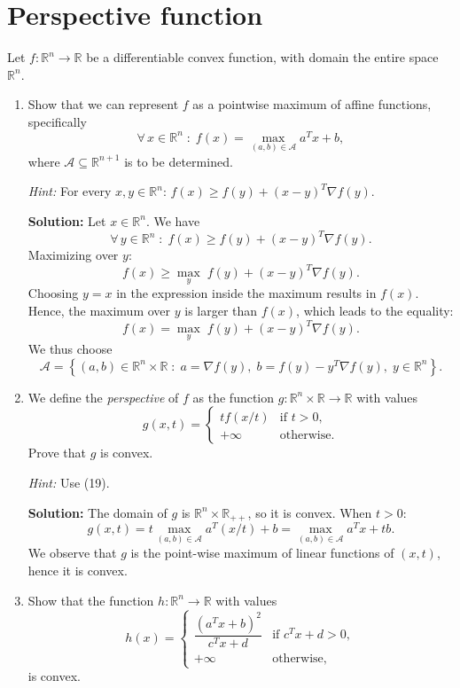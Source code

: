 \documentclass[10pt]{article}
\theoremstyle{definition}
\theoremstyle{plain}
\newcommand{\RR}{\mathbb{R}}
\begin{document}
\section{Perspective function}

Let $f : \RR^n \to \RR$ be a differentiable convex function, with domain the entire space $\RR^n$.

\begin{enumerate}[label=(\alph*)]
    \item Show that we can represent $f$ as a pointwise maximum of affine functions, specifically
    \begin{equation}
        \forall\, x \in \RR^n \;:\; f(x) = \max_{(a,b) \in \mathcal{A}} a^T x + b,
    \end{equation}
    where $\mathcal{A} \subseteq \RR^{n+1}$ is to be determined.

    \emph{Hint:} For every $x, y \in \RR^n$: $f(x) \ge f(y) + (x - y)^T \nabla f(y)$.

    \textbf{Solution:} Let $x \in \RR^n$. We have
    \[
        \forall\, y \in \RR^n \;:\; f(x) \ge f(y) + (x - y)^T \nabla f(y).
    \]
    Maximizing over $y$:
    \[
        f(x) \ge \max_y \; f(y) + (x - y)^T \nabla f(y).
    \]
    Choosing $y = x$ in the expression inside the maximum results in $f(x)$. Hence, the maximum over $y$ is larger than $f(x)$, which leads to the equality:
    \[
        f(x) = \max_y \; f(y) + (x - y)^T \nabla f(y).
    \]
    We thus choose
    \[
        \mathcal{A} = \left\{(a, b) \in \RR^n \times \RR \;:\; a = \nabla f(y), \; b = f(y) - y^T \nabla f(y), \; y \in \RR^n\right\}.
    \]

    \item We define the \emph{perspective} of $f$ as the function $g : \RR^n \times \RR \to \RR$ with values
    \[
        g(x, t) = \begin{cases} tf(x/t) & \text{if } t > 0, \\ +\infty & \text{otherwise.} \end{cases}
    \]
    Prove that $g$ is convex.

    \emph{Hint:} Use (19).

    \textbf{Solution:} The domain of $g$ is $\RR^n \times \RR_{++}$, so it is convex. When $t > 0$:
    \[
        g(x, t) = t \max_{(a,b) \in \mathcal{A}} a^T(x/t) + b = \max_{(a,b) \in \mathcal{A}} a^T x + tb.
    \]
    We observe that $g$ is the point-wise maximum of linear functions of $(x, t)$, hence it is convex.

    \item Show that the function $h : \RR^n \to \RR$ with values
    \[
        h(x) = \begin{cases} \dfrac{(a^T x + b)^2}{c^T x + d} & \text{if } c^T x + d > 0, \\[6pt] +\infty & \text{otherwise,} \end{cases}
    \]
    is convex.


\end{enumerate}
\end{document}
